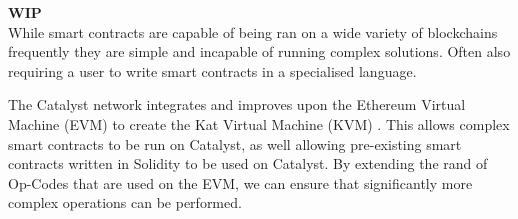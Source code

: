 \textbf{WIP} \\

While smart contracts are capable of being ran on a wide variety of blockchains frequently they are simple and incapable of running complex solutions. Often also requiring a user to write smart contracts in a specialised language. 

The Catalyst network integrates and improves upon the Ethereum Virtual Machine (EVM) to create the Kat Virtual Machine (KVM) \cite{KVM}. This allows complex smart contracts to be run on Catalyst, as well allowing pre-existing smart contracts written in Solidity to be used on Catalyst. By extending the rand of Op-Codes that are used on the EVM, we can ensure that significantly more complex operations can be performed.

